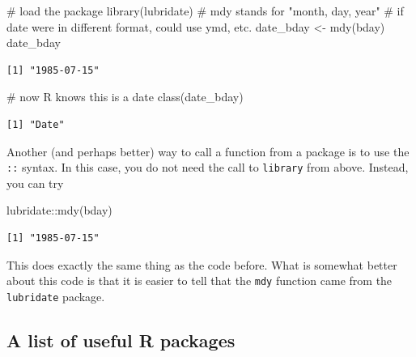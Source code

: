 \documentclass[
  letterpaper,
  DIV=11,
  numbers=noendperiod]{scrreprt}
\newenvironment{Shaded}{\begin{snugshade}}{\end{snugshade}}
\newcommand{\CommentTok}[1]{\textcolor[rgb]{0.37,0.37,0.37}{#1}}
\newcommand{\FunctionTok}[1]{\textcolor[rgb]{0.28,0.35,0.67}{#1}}
\newcommand{\NormalTok}[1]{\textcolor[rgb]{0.00,0.23,0.31}{#1}}
\newcommand{\OtherTok}[1]{\textcolor[rgb]{0.00,0.23,0.31}{#1}}
\newcommand{\SpecialCharTok}[1]{\textcolor[rgb]{0.37,0.37,0.37}{#1}}
\begin{document}
\begin{Shaded}
\begin{Highlighting}[]
\CommentTok{\# load the package}
\FunctionTok{library}\NormalTok{(lubridate)}
\CommentTok{\# mdy stands for "month, day, year"}
\CommentTok{\# if date were in different format, could use ymd, etc.}
\NormalTok{date\_bday }\OtherTok{\textless{}{-}} \FunctionTok{mdy}\NormalTok{(bday)}
\NormalTok{date\_bday}
\end{Highlighting}
\end{Shaded}

\begin{verbatim}
[1] "1985-07-15"
\end{verbatim}

\begin{Shaded}
\begin{Highlighting}[]
\CommentTok{\# now R knows this is a date}
\FunctionTok{class}\NormalTok{(date\_bday)}
\end{Highlighting}
\end{Shaded}

\begin{verbatim}
[1] "Date"
\end{verbatim}

Another (and perhaps better) way to call a function from a package is to
use the \texttt{::} syntax. In this case, you do not need the call to
\texttt{library} from above. Instead, you can try

\begin{Shaded}
\begin{Highlighting}[]
\NormalTok{lubridate}\SpecialCharTok{::}\FunctionTok{mdy}\NormalTok{(bday)}
\end{Highlighting}
\end{Shaded}

\begin{verbatim}
[1] "1985-07-15"
\end{verbatim}

This does exactly the same thing as the code before. What is somewhat
better about this code is that it is easier to tell that the
\texttt{mdy} function came from the \texttt{lubridate} package.

\subsection{A list of useful R
packages}\label{a-list-of-useful-r-packages}
\end{document}
